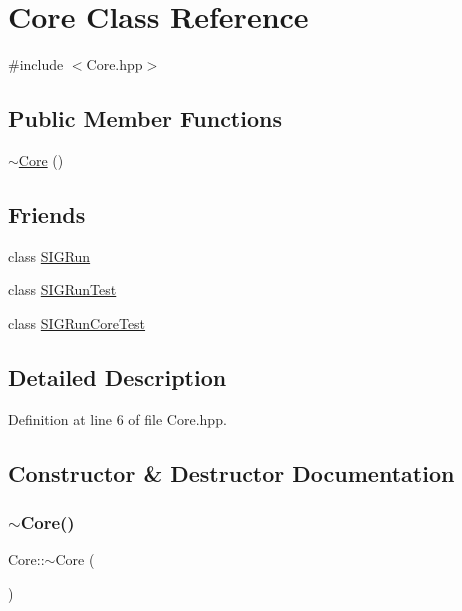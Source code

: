 \hypertarget{class_core}{}\section{Core Class Reference}
\label{class_core}


{\ttfamily \#include $<$Core.\+hpp$>$}

\subsection*{Public Member Functions}
\begin{DoxyCompactItemize}
\item 
\mbox{\hyperlink{class_core_a776f8c46504b14183883c6273f93eaed}{$\sim$\+Core}} ()
\end{DoxyCompactItemize}
\subsection*{Friends}
\begin{DoxyCompactItemize}
\item 
class \mbox{\hyperlink{class_core_a5f9132838c20db918d2592c4c0f0dcbb}{S\+I\+G\+Run}}
\item 
class \mbox{\hyperlink{class_core_a703c4760c08c6e9065d8bd71b05c3d63}{S\+I\+G\+Run\+Test}}
\item 
class \mbox{\hyperlink{class_core_a0428dbcb31e2aacead72907324826035}{S\+I\+G\+Run\+Core\+Test}}
\end{DoxyCompactItemize}


\subsection{Detailed Description}


Definition at line 6 of file Core.\+hpp.



\subsection{Constructor \& Destructor Documentation}
\mbox{\label{class_core_a776f8c46504b14183883c6273f93eaed}} 
\subsubsection{\texorpdfstring{$\sim$Core()}{~Core()}}
{\footnotesize\ttfamily Core\+::$\sim$\+Core (\begin{DoxyParamCaption}{ }\end{DoxyParamCaption})}



